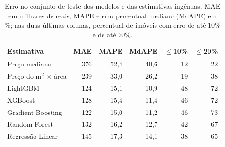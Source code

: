 \begin{table}[ht]
\centering
\caption{Erro no conjunto de teste dos modelos e das estimativas ingênuas. MAE em milhares de reais; MAPE e erro percentual mediano (MdAPE) em \%; nas duas últimas colunas, percentual de imóveis com erro de até 10\% e de até 20\%.}
\label{tab:referencias}
\small
\begin{tabular}{lrrrrr}
\toprule
\textbf{Estimativa} & \textbf{MAE} & \textbf{MAPE} & \textbf{MdAPE} & \textbf{$\leq$10\%} & \textbf{$\leq$20\%} \\
\midrule
Preço mediano & 376 & 52,4 & 40,6 & 12 & 22 \\
Preço do m$^2$ $\times$ área & 239 & 33,0 & 26,2 & 19 & 38 \\
\midrule
LightGBM & 124 & 15,1 & 10,9 & 48 & 72 \\
XGBoost & 128 & 15,4 & 11,4 & 46 & 72 \\
Gradient Boosting & 122 & 15,0 & 11,2 & 46 & 73 \\
Random Forest & 132 & 16,2 & 12,7 & 42 & 67 \\
Regressão Linear & 145 & 17,3 & 14,1 & 38 & 65 \\
\bottomrule
\end{tabular}
\end{table}
